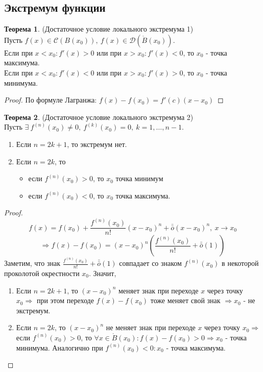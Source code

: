 \documentclass[a4paper, 12pt]{article}
\theoremstyle{definition}
\newtheorem*{theorem}{Теорема}
\begin{document}
        \subsection{Экстремум функции}
        \begin{theorem} (Достаточное условие локального экстремума 1)\\
            Пусть $f(x)\in \mathcal{C}(B(x_0)),\ f(x)\in \mathcal{D}(\mathring{B}(x_0))$. \\
            Если при $x<x_0: f'(x)>0$ или при $x>x_0: f'(x)<0$, то $x_0$ - точка максимума.\\
            Если при $x<x_0: f'(x)<0$ или при $x>x_0: f'(x)>0$, то $x_0$ - точка минимума.
        \end{theorem} 
        \begin{proof}
            По формуле Лагранжа: $f(x)-f(x_0)=f'(c)(x-x_0)$
        \end{proof} 
        \begin{theorem} (Достаточное условие локального экстремума 2)\\
            Пусть $\exists\ f^{(n)}(x_0)\ne 0,\ f^{(k)}(x_0)=0,\ k=1, \dots, n-1$.
            \begin{enumerate}
                \item Если $n=2k+1$, то экстремум нет.
                \item Если $n=2k$, то
                \begin{itemize}
                    \item если $f^{(n)}(x_0)>0$, то $x_0$ точка минимум
                    \item если $f^{(n)}(x_0)<0$, то $x_0$ точка максимума.
                \end{itemize}
            \end{enumerate}
        \end{theorem} 
        \begin{proof}
            \[f(x)=f(x_0)+\frac{f^{(n)}(x_0)}{n!}(x-x_0)^n+\bar{\bar{o}}{(x-x_0)^n},\ x\to x_0\]
            \[\Rightarrow f(x)-f(x_0)=(x-x_0)^n(\frac{f^{(n)}(x_0)}{n!}+\bar{\bar{o}}{(1)})\]
            Заметим, что знак $\frac{f^{(n)}(x_0)}{n!}+\bar{\bar{o}}{(1)}$ совпадает со знаком $f^{(n)}(x_0)$ в некоторой проколотой окрестности $x_0$. Значит,
            \begin{enumerate}
                \item Если $n=2k+1$, то $(x-x_0)^n$ меняет знак при переходе $x$ через точку $x_0 \Rightarrow$ при этом переходе $f(x)-f(x_0)$ тоже меняет свой знак $\Rightarrow x_0$ - не экстремум.
                \item Если $n=2k$, то $(x-x_0)^n$ не меняет знак при переходе $x$ через точку $x_0 \Rightarrow$ если $f^{(n)}(x_0)>0$, то $\forall x \in \mathring{B}(x_0): f(x)-f(x_0)>0 \Rightarrow x_0$ - точка минимума. Аналогично при $f^{(n)}(x_0)<0: x_0$ - точка максимума.
            \end{enumerate}
            
        \end{proof} 
\end{document}
